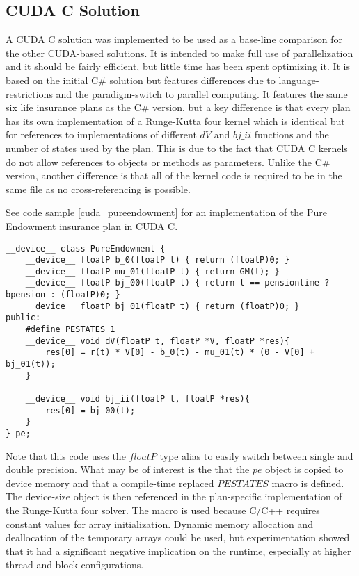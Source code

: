 \subsection{CUDA C Solution}
A CUDA C solution was implemented to be used as a base-line comparison for the other CUDA-based solutions.
It is intended to make full use of parallelization and it should be fairly efficient, but little time has been spent optimizing it.
It is based on the initial C\# solution but features differences due to language-restrictions and the paradigm-switch to parallel computing.
It features the same six life insurance plans as the C\# version, but a key difference is that every plan has its own implementation of a Runge-Kutta four kernel which is identical but for references to implementations of different $dV$ and $bj\_ii$ functions and the number of states used by the plan.
This is due to the fact that CUDA C kernels do not allow references to objects or methods as parameters. %
Unlike the C\# version, another difference is that all of the kernel code is required to be in the same file as no cross-referencing is possible.

See code sample \ref{cuda_pureendowment} for an implementation of the Pure Endowment insurance plan in CUDA C.
\begin{lstlisting}[language=cudac, caption=The pure endowment insurance plan expressed in CUDA C, label=cuda_pureendowment]
__device__ class PureEndowment {
	__device__ floatP b_0(floatP t) { return (floatP)0; }
	__device__ floatP mu_01(floatP t) { return GM(t); }
	__device__ floatP bj_00(floatP t) { return t == pensiontime ? bpension : (floatP)0; }
	__device__ floatP bj_01(floatP t) { return (floatP)0; }
public:
	#define PESTATES 1
	__device__ void dV(floatP t, floatP *V, floatP *res){ 
		res[0] = r(t) * V[0] - b_0(t) - mu_01(t) * (0 - V[0] + bj_01(t));
	}

	__device__ void bj_ii(floatP t, floatP *res){
		res[0] = bj_00(t);
	}
} pe;
\end{lstlisting}

Note that this code uses the $floatP$ type alias to easily switch between single and double precision.
What may be of interest is the that the $pe$ object is copied to device memory and that a compile-time replaced $PESTATES$ macro is defined.
The device-size object is then referenced in the plan-specific implementation of the Runge-Kutta four solver.
The macro is used because C/C++ requires constant values for array initialization.
Dynamic memory allocation and deallocation of the temporary arrays could be used, but experimentation showed that it had a significant negative implication on the runtime, especially at higher thread and block configurations.

